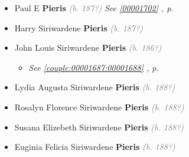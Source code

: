 \documentclass[10pt, openany]{book}
\begin{document}
\begin{itemize}
{\begin{itemize}
{\begin{itemize}
{\begin{itemize}
{\begin{itemize}
{\begin{itemize}
{\begin{itemize}
\end{itemize}
 }
\item{Susil \textbf{Pieris} \textcolor{gray}{\textit{(b. 195?)}}
 }
\item{Priyanga \textbf{Pieris} \textcolor{gray}{\textit{(b. 195?)}}
\begin{itemize}
\item{\textit{m.} Eranga \textbf{UNKNOWN} \textcolor{gray}{\textit{(b. 195?)}}   \label{couple:00001577:00001578} \begin{itemize}
\item{Dinuka \textbf{Pieris} \textcolor{gray}{\textit{(b. 198?)}}
 }
\end{itemize}}
\end{itemize}
 }
\end{itemize}}
\end{itemize}
  }
\end{itemize}}
\end{itemize}
   }
\item{Paul E \textbf{Pieris} \textcolor{gray}{\textit{(b. 187?)}} \textcolor{slteal}{\textit{See  \autoref{00001702} \textit{, p. \pageref{00001702} }}}}
\item{Harry Siriwardene \textbf{Pieris} \textcolor{gray}{\textit{(b. 187?)}}
  }
\item{John Louis Siriwardene \textbf{Pieris} \textcolor{gray}{\textit{(b. 186?)}}
\begin{itemize}
\item{\textcolor{slteal}{\textit{See  \autoref{couple:00001687:00001688} \textit{, p. \pageref{couple:00001687:00001688} }}}}
\end{itemize}
   }
\item{Lydia Augusta Siriwardene \textbf{Pieris} \textcolor{gray}{\textit{(b. 188?)}}
   }
\item{Rosalyn Florence Siriwardene \textbf{Pieris} \textcolor{gray}{\textit{(b. 188?)}}
   }
\item{Susana Elizebeth Siriwardene \textbf{Pieris} \textcolor{gray}{\textit{(b. 188?)}}
   }
\item{Euginia Felicia Siriwardene \textbf{Pieris} \textcolor{gray}{\textit{(b. 188?)}}
   }
\end{itemize}}
\end{itemize}
   
\end{document}
